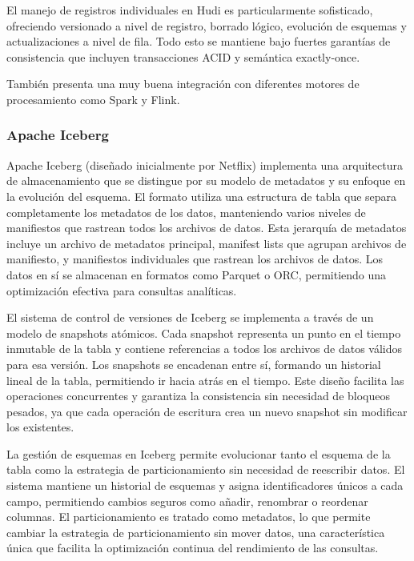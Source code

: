 El manejo de registros individuales en Hudi es particularmente sofisticado, ofreciendo versionado a nivel de registro, borrado lógico, 
evolución de esquemas y actualizaciones a nivel de fila. 
Todo esto se mantiene bajo fuertes garantías de consistencia que incluyen transacciones ACID y semántica exactly-once. 

También presenta una muy buena integración con diferentes motores de procesamiento como Spark y Flink.

\subsubsection{Apache Iceberg}

Apache Iceberg (diseñado inicialmente por Netflix) implementa una arquitectura de almacenamiento que se distingue por su 
modelo de metadatos y su enfoque en la evolución del esquema. 
El formato utiliza una estructura de tabla que separa completamente los metadatos de los datos, 
manteniendo varios niveles de manifiestos que rastrean todos los archivos de datos. 
Esta jerarquía de metadatos incluye un archivo de metadatos principal, manifest lists que agrupan archivos de manifiesto, 
y manifiestos individuales que rastrean los archivos de datos. 
Los datos en sí se almacenan en formatos como Parquet o ORC, permitiendo una optimización efectiva para consultas analíticas.

El sistema de control de versiones de Iceberg se implementa a través de un modelo de snapshots atómicos. 
Cada snapshot representa un punto en el tiempo inmutable de la tabla y contiene referencias a todos los archivos de datos válidos para esa versión. 
Los snapshots se encadenan entre sí, formando un historial lineal de la tabla, permitiendo ir hacia atrás en el tiempo. 
Este diseño facilita las operaciones concurrentes y garantiza la consistencia sin necesidad de bloqueos pesados, 
ya que cada operación de escritura crea un nuevo snapshot sin modificar los existentes.

La gestión de esquemas en Iceberg permite evolucionar tanto el esquema de la tabla como la estrategia de particionamiento 
sin necesidad de reescribir datos. 
El sistema mantiene un historial de esquemas y asigna identificadores únicos a cada campo, 
permitiendo cambios seguros como añadir, renombrar o reordenar columnas. 
El particionamiento es tratado como metadatos, lo que permite cambiar la estrategia de particionamiento sin mover datos, 
una característica única que facilita la optimización continua del rendimiento de las consultas.

